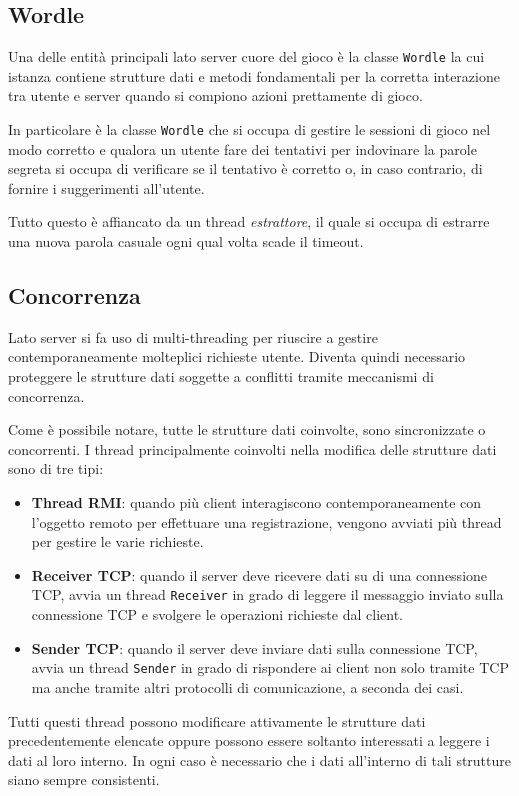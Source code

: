 \subsection{Wordle}
Una delle entità principali lato server cuore del gioco è la classe \verb|Wordle| la cui istanza
contiene strutture dati e metodi fondamentali per la corretta interazione tra utente e server
quando si compiono azioni prettamente di gioco.

In particolare è la classe \verb|Wordle| che si occupa di gestire le sessioni di gioco nel modo
corretto e qualora un utente fare dei tentativi per indovinare la parole segreta si occupa di
verificare se il tentativo è corretto o, in caso contrario, di fornire i suggerimenti all'utente.

Tutto questo è affiancato da un thread \emph{estrattore}, il quale si occupa di estrarre una nuova
parola casuale ogni qual volta scade il timeout.

\subsection{Concorrenza}
Lato server si fa uso di multi-threading per riuscire a gestire contemporaneamente molteplici
richieste utente. Diventa quindi necessario proteggere le strutture dati soggette a conflitti
tramite meccanismi di concorrenza.

Come è possibile notare, tutte le strutture dati coinvolte, sono sincronizzate o concorrenti. I
thread principalmente coinvolti nella modifica delle strutture dati sono di tre tipi:
\begin{itemize}
	\item \textbf{Thread RMI}: quando più client interagiscono contemporaneamente con l'oggetto
	      remoto per effettuare una registrazione, vengono avviati più thread per gestire le varie
	      richieste.
	\item \textbf{Receiver TCP}: quando il server deve ricevere dati su di una connessione TCP,
	      avvia un thread \verb|Receiver| in grado di leggere il messaggio inviato sulla
	      connessione TCP e svolgere le operazioni richieste dal client.
	\item \textbf{Sender TCP}: quando il server deve inviare dati sulla connessione TCP, avvia un
	      thread \verb|Sender| in grado di rispondere ai client non solo tramite TCP ma anche
	      tramite altri protocolli di comunicazione, a seconda dei casi.
\end{itemize}
Tutti questi thread possono modificare attivamente le strutture dati precedentemente elencate
oppure possono essere soltanto interessati a leggere i dati al loro interno. In ogni caso è
necessario che i dati all'interno di tali strutture siano sempre consistenti.

